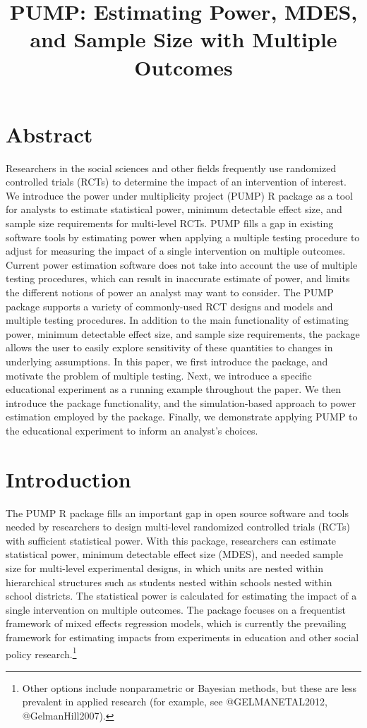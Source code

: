 \documentclass[
]{article}
\title{PUMP: Estimating Power, MDES, and Sample Size with Multiple
Outcomes}
\author{}
\date{\vspace{-2.5em}}
\begin{document}
\maketitle

\section*{Abstract}

Researchers in the social sciences and other fields frequently use
randomized controlled trials (RCTs) to determine the impact of an
intervention of interest. We introduce the power under multiplicity
project (PUMP) R package as a tool for analysts to estimate statistical
power, minimum detectable effect size, and sample size requirements for
multi-level RCTs. PUMP fills a gap in existing software tools by
estimating power when applying a multiple testing procedure to adjust
for measuring the impact of a single intervention on multiple outcomes.
Current power estimation software does not take into account the use of
multiple testing procedures, which can result in inaccurate estimate of
power, and limits the different notions of power an analyst may want to
consider. The PUMP package supports a variety of commonly-used RCT
designs and models and multiple testing procedures. In addition to the
main functionality of estimating power, minimum detectable effect size,
and sample size requirements, the package allows the user to easily
explore sensitivity of these quantities to changes in underlying
assumptions. In this paper, we first introduce the package, and motivate
the problem of multiple testing. Next, we introduce a specific
educational experiment as a running example throughout the paper. We
then introduce the package functionality, and the simulation-based
approach to power estimation employed by the package. Finally, we
demonstrate applying PUMP to the educational experiment to inform an
analyst's choices.

\section{Introduction}
\label{sec:intro}

The PUMP R package fills an important gap in open source software and
tools needed by researchers to design multi-level randomized controlled
trials (RCTs) with sufficient statistical power. With this package,
researchers can estimate statistical power, minimum detectable effect
size (MDES), and needed sample size for multi-level experimental
designs, in which units are nested within hierarchical structures such
as students nested within schools nested within school districts. The
statistical power is calculated for estimating the impact of a single
intervention on multiple outcomes. The package focuses on a frequentist
framework of mixed effects regression models, which is currently the
prevailing framework for estimating impacts from experiments in
education and other social policy
research.\footnote{Other options include nonparametric or Bayesian methods, but these are less prevalent in applied research (for example, see @GELMANETAL2012, @GelmanHill2007).}
\end{document}

